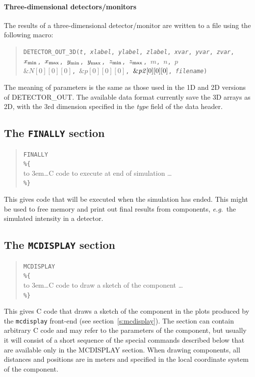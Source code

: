 \paragraph{Three-dimensional detectors/monitors}

The results of a three-dimensional detector/\discretionary{}{}{}mon\-i\-tor are written to a file using the
following macro:

\begin{quote}
  \texttt{DETECTOR\_OUT\_3D({\it t},
        {\it xlabel}, {\it ylabel}, {\it zlabel},
        {\it xvar}, {\it yvar}, {\it zvar},
        $x_{\rm min}$, $x_{\rm max}$, $y_{\rm min}$, $y_{\rm max}$, 
        $z_{\rm min}$, $z_{\rm max}$, $m$, $n$, $p$\\
          $\&N[0][0][0]$, $\&p[0][0][0]$, $\&{\it p2}[0][0][0]$,
        {\it filename})}
\end{quote}
The meaning of parameters is the same as those used in the 1D and 2D
versions of DETECTOR\_OUT. The available data format currently save
the 3D arrays as 2D, with the 3rd dimension specified in the {\it
  type} field of the data header.

\subsection{The \texttt{FINALLY} section}
\label{s:comp-finally}

\begin{quote}
  \texttt{FINALLY} \\
  \verb|%{| \\
  \hbox to 3em{}\ldots C code to execute at end of simulation \ldots \\
  \verb|%}|
\end{quote}
This gives code that will be executed when the simulation has
ended. This might be used to free memory and print out final results from components, \textit{e.g}.\ the
simulated intensity in a detector.

\subsection{The \texttt{MCDISPLAY} section}
\label{s:comp-mcdisplay}

\begin{quote}
  \texttt{MCDISPLAY} \\
  \verb|%{| \\
  \hbox to 3em{}\ldots C code to draw a sketch of the component \ldots \\
  \verb|%}|
\end{quote}
This gives C code that draws a sketch of the component in the plots
produced by the \verb+mcdisplay+ front-end (see
section~\ref{s:mcdisplay}). The section can contain arbitrary C code and
may refer to the parameters of the component, but usually it will
consist of a short sequence of the special commands described below that
are available only in the MCDISPLAY section.
When drawing components, all distances and positions are in meters and
specified in the local coordinate system of the component.

